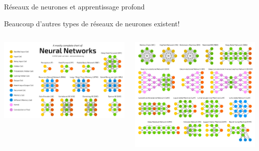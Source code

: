 \documentclass[french]{beamer}
\begin{document}
\begin{frame}{Réseaux de neurones et apprentissage profond}
\begin{center}
Beaucoup d'autres types de réseaux de neurones existent!
\end{center}
\begin{columns}[T]
\begin{column}{.52\textwidth}
\includegraphics[width=\textwidth]{figures/map_nn_1}
\end{column}
\hfill
\begin{column}{.52\textwidth}
\includegraphics[width=\textwidth]{figures/map_nn_2}
\end{column}
\end{columns}
\end{frame}
\end{document}
